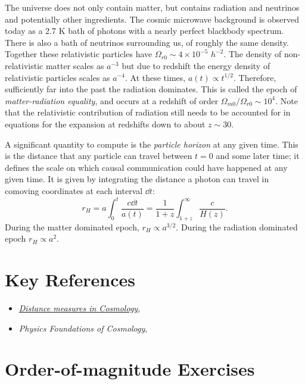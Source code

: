 The universe does not only contain matter, but contains radiation and
neutrinos and potentially other ingredients.  The cosmic microwave
background is observed today as a 2.7 K bath of photons with a nearly
perfect blackbody spectrum.  There is also a bath of neutrinos
surrounding us, of roughly the same density. Together these
relativistic particles have $\Omega_{r0} \sim 4\times 10^{-5}$
$h^{-2}$.  The density of non-relativistic matter scales as $a^{-3}$
but due to redshift the energy density of relativistic particles
scales as $a^{-4}$. At these times, $a(t)\propto t^{1/2}$. Therefore,
sufficiently far into the past the radiation dominates.  This is
called the epoch of {\it matter-radiation equality}, and occurs at a
redshift of order $\Omega_{m0}/\Omega_{r0} \sim 10^4$. Note that the
relativistic contribution of radiation still needs to be accounted for
in equations for the expansion at redshifts down to about $z\sim 30$.

A significant quantity to compute is the {\it particle horizon} at any
given time. This is the distance that any particle can travel between
$t=0$ and some later time; it defines the scale on which causal
communication could have happened at any given time. It is given by
integrating the distance a photon can travel in comoving coordinates
at each interval $\dd t$:
\begin{equation}
r_H = a \int_0^t \frac{c \dd t}{a(t)}
= \frac{1}{1+z} \int_{1+z}^\infty \frac{c}{H(z)}.
\end{equation}
During the matter dominated epoch, $r_H\propto a^{3/2}$. During the
radiation dominated epoch $r_H\propto a^2$.

\section{Key References}

\begin{itemize}
  \item
    \href{http://adsabs.harvard.edu/abs/1999astro.ph..5116H}{
    {\it Distance measures in Cosmology},
      \citet{hogg99cosm}}
  \item
    {\it Physics Foundations of Cosmology},
    \citet{mukhanov05a}
\end{itemize}

\section{Order-of-magnitude Exercises}

